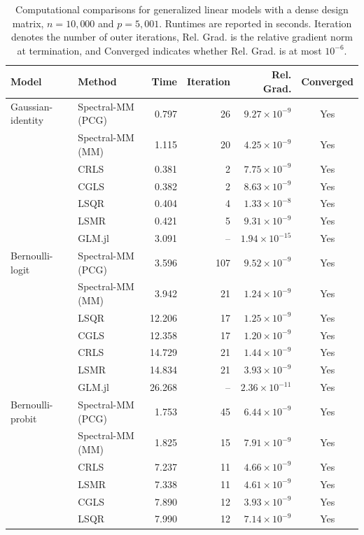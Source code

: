 \begin{table}[htbp]
\centering
\caption{
Computational comparisons for generalized linear models with a dense design matrix,
$n=10{,}000$ and $p=5{,}001$.
Runtimes are reported in seconds.
Iteration denotes the number of outer iterations,
Rel. Grad. is the relative gradient norm at termination,
and Converged indicates whether Rel. Grad. is at most $10^{-6}$.
}
\label{tab:glm-comparison-dense}
\begin{tabular}{llrrrc}
\toprule
Model & Method & Time & Iteration & Rel. Grad. & Converged \\
\midrule
Gaussian-identity & Spectral-MM (PCG) & 0.797 & 26 & $9.27\times10^{-9}$ & Yes \\
 & Spectral-MM (MM) & 1.115 & 20 & $4.25\times10^{-9}$ & Yes \\
 & CRLS & 0.381 & 2 & $7.75\times10^{-9}$ & Yes \\
 & CGLS & 0.382 & 2 & $8.63\times10^{-9}$ & Yes \\
 & LSQR & 0.404 & 4 & $1.33\times10^{-8}$ & Yes \\
 & LSMR & 0.421 & 5 & $9.31\times10^{-9}$ & Yes \\
 & GLM.jl & 3.091 & -- & $1.94\times10^{-15}$ & Yes \\
\midrule
Bernoulli-logit & Spectral-MM (PCG) & 3.596 & 107 & $9.52\times10^{-9}$ & Yes \\
 & Spectral-MM (MM) & 3.942 & 21 & $1.24\times10^{-9}$ & Yes \\
 & LSQR & 12.206 & 17 & $1.25\times10^{-9}$ & Yes \\
 & CGLS & 12.358 & 17 & $1.20\times10^{-9}$ & Yes \\
 & CRLS & 14.729 & 21 & $1.44\times10^{-9}$ & Yes \\
 & LSMR & 14.834 & 21 & $3.93\times10^{-9}$ & Yes \\
 & GLM.jl & 26.268 & -- & $2.36\times10^{-11}$ & Yes \\
\midrule
Bernoulli-probit & Spectral-MM (PCG) & 1.753 & 45 & $6.44\times10^{-9}$ & Yes \\
 & Spectral-MM (MM) & 1.825 & 15 & $7.91\times10^{-9}$ & Yes \\
 & CRLS & 7.237 & 11 & $4.66\times10^{-9}$ & Yes \\
 & LSMR & 7.338 & 11 & $4.61\times10^{-9}$ & Yes \\
 & CGLS & 7.890 & 12 & $3.93\times10^{-9}$ & Yes \\
 & LSQR & 7.990 & 12 & $7.14\times10^{-9}$ & Yes \\

\end{tabular}
\end{table}

